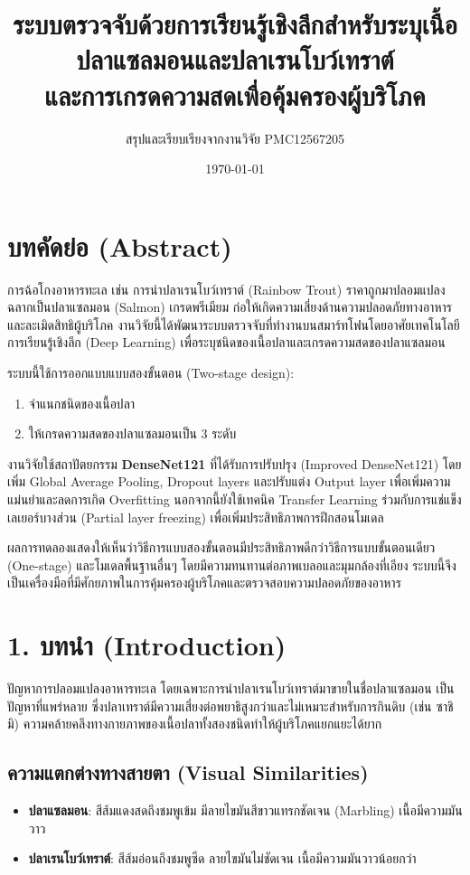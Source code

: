 \documentclass[a4paper,12pt]{article}
\title{\textbf{ระบบตรวจจับด้วยการเรียนรู้เชิงลึกสำหรับระบุเนื้อปลาแซลมอนและปลาเรนโบว์เทราต์\\และการเกรดความสดเพื่อคุ้มครองผู้บริโภค}}
\author{สรุปและเรียบเรียงจากงานวิจัย PMC12567205}
\date{\today}
\begin{document}
\maketitle

\section{บทคัดย่อ (Abstract)}
การฉ้อโกงอาหารทะเล เช่น การนำปลาเรนโบว์เทราต์ (Rainbow Trout) ราคาถูกมาปลอมแปลงฉลากเป็นปลาแซลมอน (Salmon) เกรดพรีเมียม ก่อให้เกิดความเสี่ยงด้านความปลอดภัยทางอาหารและละเมิดสิทธิผู้บริโภค งานวิจัยนี้ได้พัฒนาระบบตรวจจับที่ทำงานบนสมาร์ทโฟนโดยอาศัยเทคโนโลยีการเรียนรู้เชิงลึก (Deep Learning) เพื่อระบุชนิดของเนื้อปลาและเกรดความสดของปลาแซลมอน

ระบบนี้ใช้การออกแบบแบบสองขั้นตอน (Two-stage design):
\begin{enumerate}
    \item จำแนกชนิดของเนื้อปลา
    \item ให้เกรดความสดของปลาแซลมอนเป็น 3 ระดับ
\end{enumerate}

งานวิจัยใช้สถาปัตยกรรม \textbf{DenseNet121} ที่ได้รับการปรับปรุง (Improved DenseNet121) โดยเพิ่ม Global Average Pooling, Dropout layers และปรับแต่ง Output layer เพื่อเพิ่มความแม่นยำและลดการเกิด Overfitting นอกจากนี้ยังใช้เทคนิค Transfer Learning ร่วมกับการแช่แข็งเลเยอร์บางส่วน (Partial layer freezing) เพื่อเพิ่มประสิทธิภาพการฝึกสอนโมเดล

ผลการทดลองแสดงให้เห็นว่าวิธีการแบบสองขั้นตอนมีประสิทธิภาพดีกว่าวิธีการแบบขั้นตอนเดียว (One-stage) และโมเดลพื้นฐานอื่นๆ โดยมีความทนทานต่อภาพเบลอและมุมกล้องที่เอียง ระบบนี้จึงเป็นเครื่องมือที่มีศักยภาพในการคุ้มครองผู้บริโภคและตรวจสอบความปลอดภัยของอาหาร

\section{1. บทนำ (Introduction)}
ปัญหาการปลอมแปลงอาหารทะเล โดยเฉพาะการนำปลาเรนโบว์เทราต์มาขายในชื่อปลาแซลมอน เป็นปัญหาที่แพร่หลาย ซึ่งปลาเทราต์มีความเสี่ยงต่อพยาธิสูงกว่าและไม่เหมาะสำหรับการกินดิบ (เช่น ซาชิมิ) ความคล้ายคลึงทางกายภาพของเนื้อปลาทั้งสองชนิดทำให้ผู้บริโภคแยกแยะได้ยาก

\subsection{ความแตกต่างทางสายตา (Visual Similarities)}
\begin{itemize}
    \item \textbf{ปลาแซลมอน}: สีส้มแดงสดถึงชมพูเข้ม มีลายไขมันสีขาวแทรกชัดเจน (Marbling) เนื้อมีความมันวาว
    \item \textbf{ปลาเรนโบว์เทราต์}: สีส้มอ่อนถึงชมพูซีด ลายไขมันไม่ชัดเจน เนื้อมีความมันวาวน้อยกว่า
\end{itemize}
\end{document}
